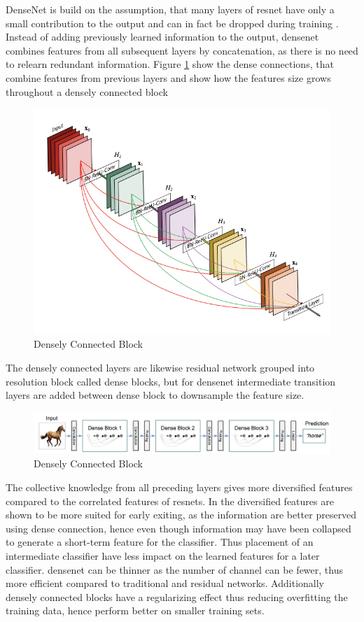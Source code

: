 DenseNet \cite{huang_densely_2016} is build on the assumption, that many layers of \gls{resnet} have only a small contribution to the output and can in fact be dropped during training \cite{huang_densely_2016}. Instead of adding previously learned information to the output, \gls{densenet} combines features from all subsequent layers by concatenation, as there is no need to relearn redundant information. Figure \ref{fig:denseblock} show the dense connections, that combine features from previous layers and show how the features size grows throughout a densely connected block

\begin{figure}
	\centering
	\includegraphics[width=.5\linewidth]{figures/models/denseblock}
	\caption[Densely Connected Block]{Densely Connected Block}
	\label{fig:denseblock}
\end{figure}

The densely connected layers are likewise residual network grouped into resolution block called dense blocks, but for \gls{densenet} intermediate transition layers are added between dense block to downsample the feature size. 

\begin{figure}
	\centering
	\includegraphics[width=\linewidth]{figures/models/densenet}
	\caption[Densely Connected Block]{Densely Connected Block}
	\label{fig:densenet}
\end{figure}

The collective knowledge from all preceding layers gives more diversified features compared to the correlated features of \gls{resnet}s. In \cite{huang_multi-scale_2017} the diversified features are shown to be more suited for early exiting,  as the information are better preserved using dense connection, hence even though information may have been collapsed to generate a short-term feature for the classifier. Thus placement of an intermediate classifier have less impact on the learned features for a later classifier. \gls{densenet} can be thinner as the number of channel can be fewer, thus more efficient compared to traditional and residual networks. Additionally densely connected blocks have a regularizing effect thus reducing overfitting the training data, hence perform better on smaller training sets. 

